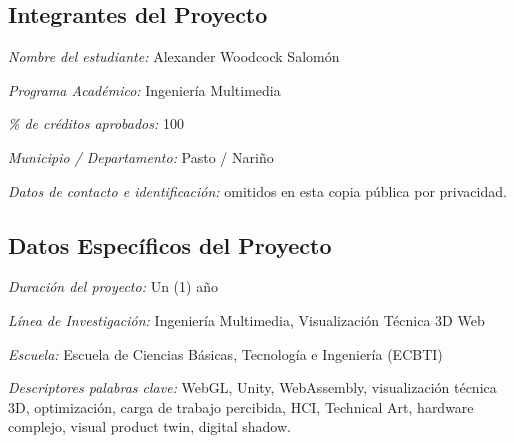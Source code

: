 ﻿\documentclass[12pt,letterpaper]{article}
\begin{document}
\subsection*{Integrantes del Proyecto}

\textit{Nombre del estudiante:} Alexander Woodcock Salomón

\textit{Programa Académico:} Ingeniería Multimedia

\textit{\% de créditos aprobados:} 100

\textit{Municipio / Departamento:} Pasto / Nariño

\textit{Datos de contacto e identificación:} omitidos en esta copia pública por privacidad.

\subsection*{Datos Específicos del Proyecto}

\textit{Duración del proyecto:} Un (1) año

\textit{Línea de Investigación:} Ingeniería Multimedia, Visualización Técnica 3D Web

\textit{Escuela:} Escuela de Ciencias Básicas, Tecnología e Ingeniería (ECBTI)

\textit{Descriptores palabras clave:} WebGL, Unity, WebAssembly, visualización técnica 3D, optimización, carga de trabajo percibida, HCI, Technical Art, hardware complejo, visual product twin, digital shadow.

\newpage










\end{document}
